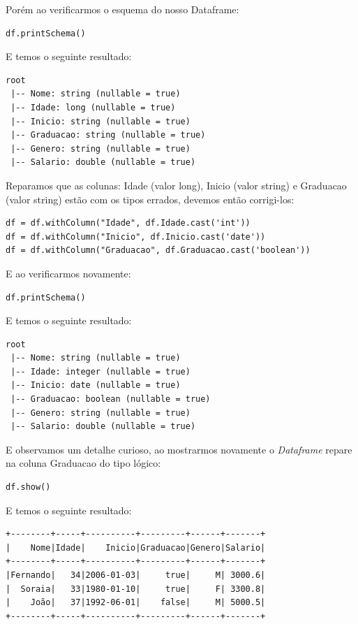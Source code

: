 Porém ao verificarmos o esquema do nosso Dataframe:
\begin{lstlisting}[]
df.printSchema()
\end{lstlisting}

E temos o seguinte resultado: \vspace{-1.5em}
\begin{verbatim}
root
 |-- Nome: string (nullable = true)
 |-- Idade: long (nullable = true)
 |-- Inicio: string (nullable = true)
 |-- Graduacao: string (nullable = true)
 |-- Genero: string (nullable = true)
 |-- Salario: double (nullable = true)
\end{verbatim}

Reparamos que as colunas: Idade (valor long), Inicio (valor string) e Graduacao (valor string) estão com os tipos errados, devemos então corrigi-los:
\begin{lstlisting}[]
df = df.withColumn("Idade", df.Idade.cast('int'))
df = df.withColumn("Inicio", df.Inicio.cast('date'))
df = df.withColumn("Graduacao", df.Graduacao.cast('boolean'))
\end{lstlisting}

E ao verificarmos novamente:
\begin{lstlisting}[]
df.printSchema()
\end{lstlisting}

E temos o seguinte resultado: \vspace{-1.5em}
\begin{verbatim}
root
 |-- Nome: string (nullable = true)
 |-- Idade: integer (nullable = true)
 |-- Inicio: date (nullable = true)
 |-- Graduacao: boolean (nullable = true)
 |-- Genero: string (nullable = true)
 |-- Salario: double (nullable = true)
\end{verbatim}

E observamos um detalhe curioso, ao mostrarmos novamente o \textit{Dataframe} repare na coluna Graduacao do tipo lógico:
\begin{lstlisting}[]
df.show()
\end{lstlisting}

E temos o seguinte resultado: \vspace{-1.5em}
\begin{verbatim}
+--------+-----+----------+---------+------+-------+
|    Nome|Idade|    Inicio|Graduacao|Genero|Salario|
+--------+-----+----------+---------+------+-------+
|Fernando|   34|2006-01-03|     true|     M| 3000.6|
|  Soraia|   33|1980-01-10|     true|     F| 3300.8|
|    João|   37|1992-06-01|    false|     M| 5000.5|
+--------+-----+----------+---------+------+-------+
\end{verbatim}

